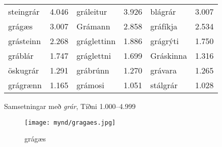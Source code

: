 \documentclass[../samsetningasafn.tex]{subfiles}
\begin{document}
\begin{wordlist}[H]
\begin{tcolorbox}

	\setlength{\extrarowheight}{3pt}
	\begin{tabular}{BlBlBl}	
		steingrár	& 4.046		& 	
		gráleitur		& 3.926		& 		
		blágrár		& 3.007		\\ 		
		grágæs		& 3.007		& 	
		Grámann	& 2.858		& 	
		gráfíkja		& 2.534		\\ 	
		grásteinn	& 2.268		& 	
		gráglettinn	& 1.886		& 		
		grágrýti		& 1.750		\\ 	
		gráblár		& 1.747		& 	
		gráglettni	& 1.699		& 	
		Gráskinna	& 1.316		\\ 		
		öskugrár	& 1.291		& 		
		grábrúnn	& 1.270		& 		
		grávara		& 1.265		\\ 			
		grágrænn	& 1.165		& 		
		grámosi		& 1.051		& 		
		stálgrár		& 1.028					
	\end{tabular}

\end{tcolorbox}
	\caption{Samsetningar með \textit{grár}, Tíðni 1.000--4.999}
	\label{listi:gratt.1000}
\end{wordlist}

\begin{figure}[H]
\begin{tcolorbox}
\centering
	\texttt{[image: mynd/gragaes.jpg]}
\end{tcolorbox}
	\caption{grágæs}
	\label{mynd:grages}
\end{figure}
\end{document}
